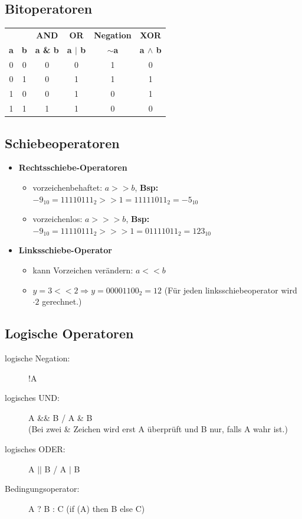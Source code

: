 \documentclass[a4paper,10pt]{article}
\newcommand{\Bold}[1]{\textbf{#1}} %
\newcommand{\Ra}{\Rightarrow}
\begin{document}
\subsection{Bitoperatoren}
\begin{tabular}{|c|c|c|c|c|c|}
	\hline
	& & \Bold {AND} & \Bold {OR} & \Bold {Negation} & \Bold {XOR} \\
	\Bold {a} & \Bold {b} & \Bold {a \& b} & \Bold {a $|$ b} & \Bold {$\sim$a} & \Bold {a $\wedge$  b} \\
	\hline
	0 & 0 & 0 & 0 & 1 & 0 \\
	0 & 1 & 0 & 1 & 1 & 1 \\
	1 & 0 & 0 & 1 & 0 & 1 \\
	1 & 1 & 1 & 1 & 0 & 0 \\
	\hline
\end{tabular}

\subsection{Schiebeoperatoren}
\begin{itemize}
	\item \Bold {Rechtsschiebe-Operatoren}
		\begin{itemize}
			\item vorzeichenbehaftet: $a >> b$, \Bold{Bsp:}$-9_{10} = 11110111_2 >> 1 = 11111011_2 = -5_{10}$
			\item vorzeichenlos: $a >>> b$, \Bold{Bsp:}$-9_{10} =  11110111_2 >>> 1 = 01111011_2 = 123_{10}$ 
		\end{itemize}
	\item \Bold {Linksschiebe-Operator}
		\begin{itemize}
			\item kann Vorzeichen ver\"andern:  $a << b$
			\item $y=3<<2\Ra y=00001100_2=12$ (F\"ur jeden linksschiebeoperator wird $\cdot 2$ gerechnet.)
		\end{itemize}
\end{itemize}

\subsection{Logische Operatoren}
\begin{description}
	\item[logische Negation:] !A
	\item[logisches UND:] A \&\& B  / A \& B \\
				(Bei zwei \& Zeichen wird erst A \"uberpr\"uft und B nur, falls A wahr ist.)
	\item[logisches ODER:] A $||$ B / A $|$ B
	\item[Bedingungsoperator:] A ? B : C (if (A) then B else C)
\end{description}
\end{document}
